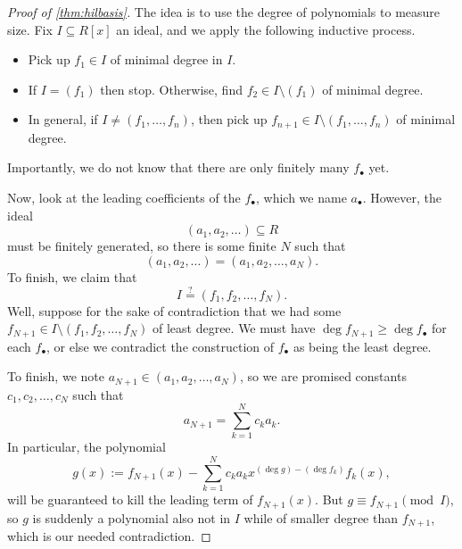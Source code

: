 \begin{proof}[Proof of \autoref{thm:hilbasis}]
	The idea is to use the degree of polynomials to measure size. Fix $I\subseteq R[x]$ an ideal, and we apply the following inductive process.
	\begin{itemize}
		\item Pick up $f_1\in I$ of minimal degree in $I$.
		\item If $I=(f_1)$ then stop. Otherwise, find $f_2\in I\setminus(f_1)$ of minimal degree.
		\item In general, if $I\ne(f_1,\ldots,f_n)$, then pick up $f_{n+1}\in I\setminus(f_1,\ldots,f_n)$ of minimal degree.
	\end{itemize}
	Importantly, we do not know that there are only finitely many $f_\bullet$ yet.

	Now, look at the leading coefficients of the $f_\bullet$, which we name $a_\bullet$. However, the ideal
	\[(a_1,a_2,\ldots)\subseteq R\]
	must be finitely generated, so there is some finite $N$ such that
	\[(a_1,a_2,\ldots)=(a_1,a_2,\ldots,a_N).\]
	To finish, we claim that
	\[I\stackrel?=(f_1,f_2,\ldots,f_N).\]
	Well, suppose for the sake of contradiction that we had some $f_{N+1}\in I\setminus(f_1,f_2,\ldots,f_N)$ of least degree. We must have $\deg f_{N+1}\ge\deg f_\bullet$ for each $f_\bullet$, or else we contradict the construction of $f_\bullet$ as being the least degree.

	To finish, we note $a_{N+1}\in(a_1,a_2,\ldots,a_N)$, so we are promised constants $c_1,c_2,\ldots,c_N$ such that
	\[a_{N+1}=\sum_{k=1}^Nc_ka_k.\]
	In particular, the polynomial
	\[g(x):=f_{N+1}(x)-\sum_{k=1}^Nc_ka_kx^{(\deg g)-(\deg f_k)}f_k(x),\]
	will be guaranteed to kill the leading term of $f_{N+1}(x)$. But $g\equiv f_{N+1}\pmod I$, so $g$ is suddenly a polynomial also not in $I$ while of smaller degree than $f_{N+1}$, which is our needed contradiction.
\end{proof}

